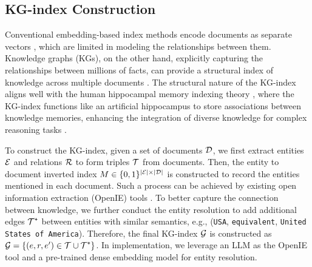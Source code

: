 

\subsection{KG-index Construction}\label{sec:kg-construction}
Conventional embedding-based index methods encode documents as separate vectors \cite{karpukhin2020dense,bge_m3,moreira2024nv}, which are limited in modeling the relationships between them. Knowledge graphs (KGs), on the other hand, explicitly capturing the relationships between millions of facts, can provide a structural index of knowledge across multiple documents \cite{edge2024local,gutiérrez2024hipporag}. The structural nature of the KG-index aligns well with the human hippocampal memory indexing theory \cite{teyler1986hippocampal}, where the KG-index functions like an artificial hippocampus to store associations between knowledge memories, enhancing the integration of diverse knowledge for complex reasoning tasks \cite{gutiérrez2024hipporag}.

To construct the KG-index, given a set of documents ${\mathcal{D}}$, we first extract entities ${\mathcal{E}}$ and relations ${\mathcal{R}}$ to form triples ${\mathcal{T}}$ from documents. Then, the entity to document inverted index $M \in \{0,1\}^{|{\mathcal{E}}|\times|{\mathcal{D}}|}$ is constructed to record the entities mentioned in each document. Such a process can be achieved by existing open information extraction (OpenIE) tools \cite{angeli2015leveraging,ijcai2022p793,pai2024survey}. To better capture the connection between knowledge, we further conduct the entity resolution \cite{gillick2019learning,zeakis2023pre} to add additional edges ${\mathcal{T}}^{\texttt{+}}$ between entities with similar semantics, e.g., (\texttt{USA}, \texttt{equivalent}, \texttt{United States of America}). Therefore, the final KG-index ${\mathcal{G}}$ is constructed as ${\mathcal{G}}=\{(e,r,e')\in{\mathcal{T}}\cup{\mathcal{T}}^{\texttt{+}}\}$. In implementation, we leverage an LLM \cite{gpt4o} as the OpenIE tool and a pre-trained dense embedding model \cite{santhanam2022colbertv2} for entity resolution.

